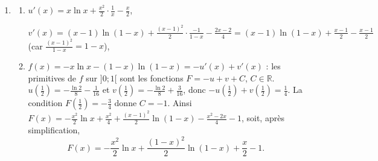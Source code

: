 \begin{enumerate}
\begin{center}
      \end{center}
   \item
      \begin{enumerate}
         \item {}
            $u'(x) = x\ln x + \frac{x^2}{2}\cdot\frac{1}{x} - \frac{x}{2}$, 

            $v'(x) = (x - 1)\ln(1 - x) + \frac{(x - 1)^2}{2}\cdot\frac{-1}{1 - x} - \frac{2x - 2}{4}
                   = (x - 1)\ln(1 - x) + \frac{x - 1}{2} - \frac{x - 1}{2}$ (car $\frac{(x-1)^2}{1-x} = 1 - x$),
            \par\noindent{}
         \item {}
            $f(x) = -x\ln x - (1 - x)\ln(1 - x) = -u'(x) + v'(x)$ : les primitives de $f$ sur $]0 ; 1[$ sont les fonctions
            $F = -u + v + C$, $C \in \mathbb{R}$.
            $u\left(\frac{1}{2}\right) = -\frac{\ln 2}{8} - \frac{1}{16}$ et $v\left(\frac{1}{2}\right) = -\frac{\ln 2}{8} + \frac{3}{16}$, donc
            $-u\left(\frac{1}{2}\right) + v\left(\frac{1}{2}\right) = \frac{1}{4}$. La condition $F\left(\frac{1}{2}\right) = -\frac{3}{4}$ donne $C = -1$.
            Ainsi $F(x) = -\frac{x^2}{2}\ln x + \frac{x^2}{4} + \frac{(x - 1)^2}{2}\ln(1 - x) - \frac{x^2 - 2x}{4} - 1$, soit, apr\`es simplification,
            \[
               \boxed{F(x) = -\frac{x^2}{2}\ln x + \frac{(1 - x)^2}{2}\ln(1 - x) + \frac{x}{2} - 1.}
            \]
      \end{enumerate}
\end{enumerate}
